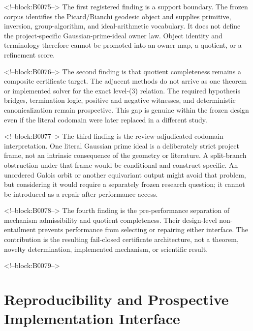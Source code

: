 \documentclass[11pt,a4paper]{article}
\begin{document}
<!--block:B0075-->
The first registered finding is a support boundary. The frozen corpus identifies the Picard/Bianchi geodesic object and supplies primitive, inversion, group-algorithm, and ideal-arithmetic vocabulary. It does not define the project-specific Gaussian-prime-ideal owner law. Object identity and terminology therefore cannot be promoted into an owner map, a quotient, or a refinement score.

<!--block:B0076-->
The second finding is that quotient completeness remains a composite certificate target. The adjacent methods do not arrive as one theorem or implemented solver for the exact level-(3) relation. The required hypothesis bridges, termination logic, positive and negative witnesses, and deterministic canonicalization remain prospective. This gap is genuine within the frozen design even if the literal codomain were later replaced in a different study.

<!--block:B0077-->
The third finding is the review-adjudicated codomain interpretation. One literal Gaussian prime ideal is a deliberately strict project frame, not an intrinsic consequence of the geometry or literature. A split-branch obstruction under that frame would be conditional and construct-specific. An unordered Galois orbit or another equivariant output might avoid that problem, but considering it would require a separately frozen research question; it cannot be introduced as a repair after performance access.

<!--block:B0078-->
The fourth finding is the pre-performance separation of mechanism admissibility and quotient completeness. Their design-level non-entailment prevents performance from selecting or repairing either interface. The contribution is the resulting fail-closed certificate architecture, not a theorem, novelty determination, implemented mechanism, or scientific result.

<!--block:B0079-->
\section{Reproducibility and Prospective Implementation Interface}
\end{document}
